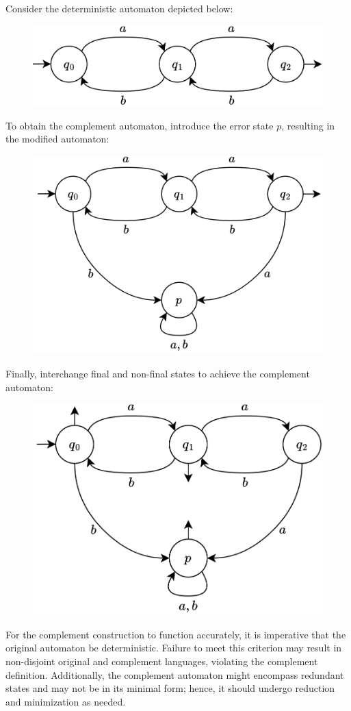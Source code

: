 \begin{example}
    Consider the deterministic automaton depicted below:
    \begin{figure}[H]
        \centering
        \includegraphics[width=0.5\linewidth]{images/compl.png}
    \end{figure}
    To obtain the complement automaton, introduce the error state $p$, resulting in the modified automaton:
    \begin{figure}[H]
        \centering
        \includegraphics[width=0.5\linewidth]{images/compl1.png}
    \end{figure}
    Finally, interchange final and non-final states to achieve the complement automaton:
    \begin{figure}[H]
        \centering
        \includegraphics[width=0.5\linewidth]{images/compl2.png}
    \end{figure}
\end{example}
For the complement construction to function accurately, it is imperative that the original automaton be deterministic. 
Failure to meet this criterion may result in non-disjoint original and complement languages, violating the complement definition. 
Additionally, the complement automaton might encompass redundant states and may not be in its minimal form; hence, it should undergo reduction and minimization as needed.

